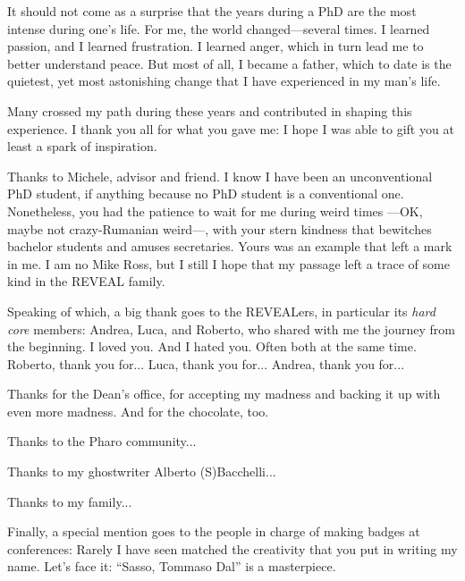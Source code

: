 
\begin{acknowledgements}

It should not come as a surprise that the years during a PhD are the most intense during one's life.
For me, the world changed---several times.
I learned passion, and I learned frustration.
I learned anger, which in turn lead me to better understand peace.
But most of all, I became a father, which to date is the quietest, yet most astonishing change that I have experienced in my man's life.

Many crossed my path during these years and contributed in shaping this experience.
I thank you all for what you gave me: I hope I was able to gift you at least a spark of inspiration.

Thanks to Michele, advisor and friend.
I know I have been an unconventional PhD student, if anything because no PhD student is a conventional one.
Nonetheless, you had the patience to wait for me during weird times ---OK, maybe not crazy-Rumanian weird---, with your stern kindness that bewitches bachelor students and amuses secretaries.
Yours was an example that left a mark in me.
I am no Mike Ross, but I still I hope that my passage left a trace of some kind in the REVEAL family.

Speaking of which, a big thank goes to the REVEALers, in particular its \emph{hard core} members: Andrea, Luca, and Roberto, who shared with me the journey from the beginning.
I loved you. And I hated you. Often both at the same time.
Roberto, thank you for...
Luca, thank you for...
Andrea, thank you for...

Thanks for the Dean's office, for accepting my madness and backing it up with even more madness.
And for the chocolate, too.

Thanks to the Pharo community...

Thanks to my ghostwriter Alberto (S)Bacchelli...

Thanks to my family...

Finally, a special mention goes to the people in charge of making badges at conferences: Rarely I have seen matched the creativity that you put in writing my name.
Let's face it: ``Sasso, Tommaso Dal'' is a masterpiece.



\end{acknowledgements}
